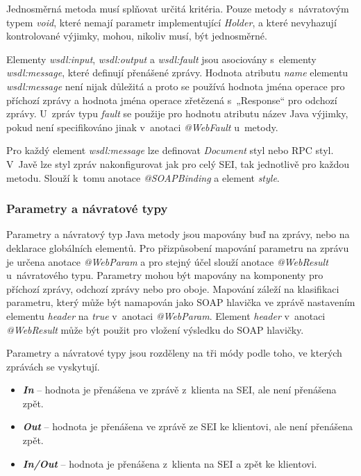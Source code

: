 \documentclass[11pt,twoside,a4paper]{book}
\begin{document}
Jednosměrná metoda musí splňovat určitá kritéria. Pouze metody
s~návratovým typem {\em void}, které nemají parametr implementující {\em
Holder}, a které nevyhazují kontrolované výjimky, mohou, nikoliv musí, být jednosměrné.

Elementy {\em wsdl:input}, {\em wsdl:output} a {\em wsdl:fault} jsou asociovány
s~elementy {\em wsdl:message}, které definují přenášené zprávy. Hodnota atributu
{\em name} elementu {\em wsdl:message} není nijak důležitá a proto se používá
hodnota jména operace pro příchozí zprávy a hodnota jména operace zřetězená
s~„Response“ pro odchozí zprávy. U~zpráv typu {\em fault} se použije pro hodnotu
atributu název Java výjimky, pokud není specifikováno jinak v~anotaci {\em
@WebFault} u~metody.

Pro každý element {\em wsdl:message} lze definovat {\em Document} styl nebo RPC
styl.
V~Javě lze styl zpráv nakonfigurovat jak pro celý SEI, tak jednotlivě pro každou
metodu. Slouží k~tomu anotace {\em @SOAPBinding} a element {\em style}.

\subsubsection{Parametry a návratové typy}

Parametry a návratový typ Java metody jsou mapovány buď na zprávy, nebo na
deklarace globálních elementů. Pro přizpůsobení mapování parametru na zprávu je určena
anotace {\em @WebParam} a pro stejný účel slouží anotace {\em @WebResult}
u~návratového typu. Parametry mohou být mapovány na komponenty pro příchozí zprávy, odchozí zprávy nebo pro oboje.
Mapování záleží na klasifikaci parametru, který může být namapován jako SOAP
hlavička ve zprávě nastavením elementu {\em header} na {\em true} v~anotaci
{\em @WebParam}.
Element {\em header} v~anotaci {\em @WebResult} může být použit pro vložení
výsledku do SOAP hlavičky.

Parametry a návratové typy jsou rozděleny na tři módy podle toho, ve kterých zprávách se
vyskytují.

\begin{itemize}
  \item \textbf{\textit{In}} – hodnota je přenášena ve zprávě z~klienta na
  SEI, ale není přenášena zpět.
  \item \textbf{\textit{Out}} – hodnota je přenášena ve zprávě ze SEI ke
  klientovi, ale není přenášena zpět.
  \item \textbf{\textit{In/Out}} – hodnota je přenášena z~klienta na SEI a
  zpět ke klientovi.
\end{itemize}
\end{document}

